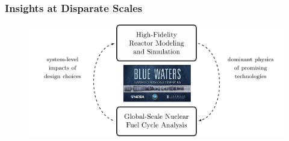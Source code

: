 \begin{frame}
  \frametitle{Insights at Disparate Scales}
               \begin{figure}[t]
                \vspace*{-0.1in}
			\hspace*{-0.35in}
                \includegraphics[height=0.5\textwidth]{./images/synergy.png}
               \end{figure}            
\end{frame}

